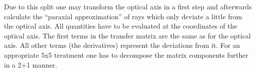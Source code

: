 \documentclass[12pt,a4paper,twoside,openright,BCOR10mm,headsepline,titlepage,abstracton,chapterprefix,final]{scrreprt}
\begin{document}
Due to this split one may transform the optical axis in a first step and afterwards calculate the ``paraxial approximation'' of rays which
only deviate a little from the optical axis. All quantities have to be evaluated at the coordinates of the optical axis. The first terms
in the transfer matrix are the same as for the optical axis. All other terms (the derivatives) represent the deviations from it.
For an appropriate 5x5 treatment one has to decompose the matrix components further in a 2+1 manner.
\end{document}
